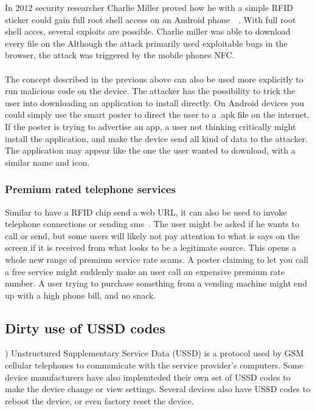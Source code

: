 \documentclass[a4paper,11pt]{article}
\begin{document}
In 2012 security researcher Charlie Miller proved how he with a simple RFID sticker could gain full root shell access on an Android phone~\cite{cmiller}~\cite{cmiller1}. With full root shell acces, several exploits are possible. Charlie miller was able to download every file on the  Although the attack primarily used exploitable bugs in the browser, the attack was triggered by the mobile phones NFC.

\paragraph{}
The concept described in the previous above can also be used more explicitly to run malicious code on the device. The attacker has the possibility to trick the user into downloading an application to install directly. On Android devices you could simply use the smart poster to direct the user to a .apk file on the internet. If the poster is trying to advertise an app, a user not thinking critically might install the application, and make the device send all kind of data to the attacker. The application may appear like the one the user wanted to download, with a similar name and icon.

\subsubsection{Premium rated telephone services}

Similar to have a RFID chip send a web URL, it can also be used to invoke telephone connections or sending sms~\cite{mulliner2009vulnerability}. The user might be asked if he wants to call or send, but some users will likely not pay attention to what is says on the screen if it is received from what looks to be a legitimate source. This opens a whole new range of premium service rate scams. A poster claiming to let you call a free service might suddenly make an user call an expensive premium rate number. A user trying to purchase something from a vending machine might end up with a high phone bill, and no snack.

\subsection{Dirty use of USSD codes})
Unstructured Supplementary Service Data (USSD) is a protocol used by GSM cellular telephones to communicate with the service provider's computers. Some device manufacturers have also implemteded their own set of USSD codes to make the device change or view settings. Several devices also have USSD codes to reboot the device, or even factory reset the device.
\end{document}
